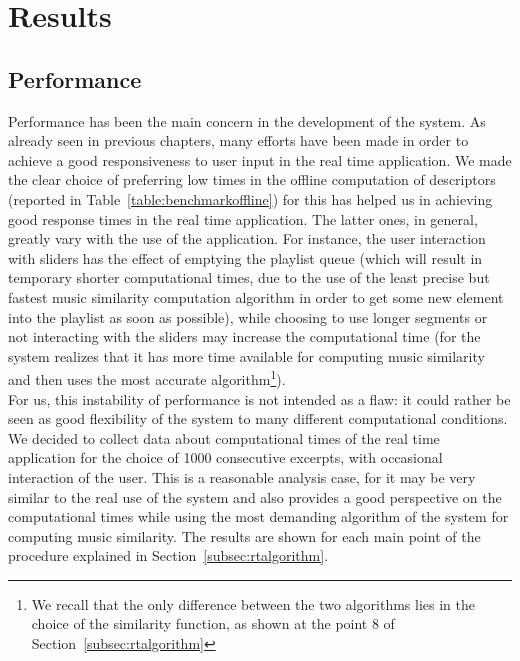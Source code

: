 \chapter{Results} 

\label{Chapter7} 


\section{Performance}
\label{sec:performanceanalysis}
Performance has been the main concern in the development of the system. As already seen in previous chapters, many efforts have been made in order to achieve a good responsiveness to user input in the real time application. We made the clear choice of preferring low times in the offline computation of descriptors (reported in Table~\ref{table:benchmarkoffline}) for this has helped us in achieving good response times in the real time application. The latter ones, in general, greatly vary with the use of the application. For instance, the user interaction with sliders has the effect of emptying the playlist queue (which will result in temporary shorter computational times, due to the use of the least precise but fastest music similarity computation algorithm in order to get some new element into the playlist as soon as possible), while choosing to use longer segments or not interacting with the sliders may increase the computational time (for the system realizes that it has more time available for computing music similarity and then uses the most accurate algorithm\footnote{We recall that the only difference between the two algorithms lies in the choice of the similarity function, as shown at the point 8 of Section~\ref{subsec:rtalgorithm}}). \\
For us, this instability of performance is not intended as a flaw: it could rather be seen as good flexibility of the system to many different computational conditions.\\
We decided to collect data about computational times of the real time application for the choice of 1000 consecutive excerpts, with occasional interaction of the user. This is a reasonable analysis case, for it may be very similar to the real use of the system and also provides a good perspective on the computational times while using the most demanding algorithm of the system for computing music similarity. The results are shown for each main point of the procedure explained in Section~\ref{subsec:rtalgorithm}.\\

